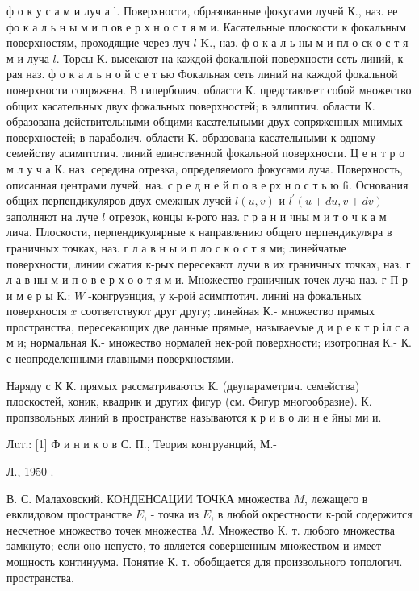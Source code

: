 \documentclass[10pt]{article}
\begin{document}
ф о к у с а м и луч а l. Поверхности, образованные фокусами лучей К., наз. ее фо к а л ь н ы м и п ов е р х н о с т я м и. Касательные плоскости к фокальным поверхностям, проходящие через луч $l$ K., наз. ф о к а л ь ны м и пл о ск о с т я м и луча $l$. Торсы К. высекают на каждой фокальной поверхности сеть линий, к-рая наз. ф о к а л ь н о й с е т ью Фокальная сеть линий на каждой фокальной поверхности сопряжена. В гиперболич. области К. представляет собой множество общих касательных двух фокальных поверхностей; в эллиптич. области К. образована действительными общими касательными двух сопряженных мнимых поверхностей; в параболич. области К. образована касательными к одному семейству асимптотич. линий единственной фокальной поверхности. Ц е н т р о м л у ч а К. наз. середина отрезка, определяемого фокусами луча. Поверхность, описанная центрами лучей, наз. с р е д н е й п о в е рх н о с т ь ю fi. Основания общих перпендикуляров двух смежных лучей $l(u, v)$ и $l^{\prime}(u+d u, v+d v)$ заполняют на луче $l$ отрезок, концы к-рого наз. г р а н и чны м и т о ч к а м лича. Плоскости, перпендикулярные к направлению общего перпендикуляра в граничных точках, наз. г л а в н ы и п ло с к о с т я ми; линейчатые поверхности, линии сжатия к-рых пересекают лучи в их граничных точках, наз. г л а в ны м и п о в е р х о о т я м и. Множество граничных точек луча наз. г П р и м е р ы К.: $W^{\prime}$-конгруэнция, у к-рой асимптотич. линиі на фокальных поверхностя $x$ соответствуют друг другу; линейная К.- множество прямых пространства, пересекающих две данные прямые, называемые д и р е к т р іл с а м и; нормальная К.- множество нормалей нек-рой поверхности; изотропная К.- К. с неопределенными главными поверхностями.



Наряду с К К. прямых рассматриваются $К$. (двупараметрич. семейства) плоскостей, коник, квадрик и других фигур (см. Фигур многообразие). К. пропзвольных линий в пространстве называются к р и в о ли н е йны ми и.



Лuт.: [1] Ф и н и к о в С. П., Теория конгруәнций, М.-

Л., 1950 .

В. С. Малаховский. КОНДЕНСАЦИИ ТОЧКА множества $M$, лежащего в евклидовом пространстве $E$, - точка из $E$, в любой окрестности к-рой содержится несчетное множество точек множества $M$. Множество К. т. любого множества замкнуто; если оно непусто, то является совершенным множеством и имеет мощность континуума. Понятие К. т. обобщается для произвольного топологич. пространства.
\end{document}
